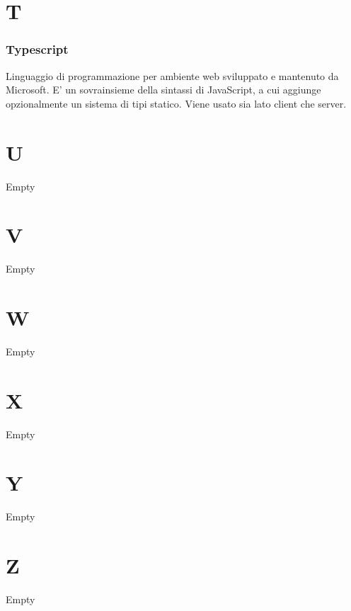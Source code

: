 \section*{T}
\subsubsection*{Typescript}
Linguaggio di programmazione per ambiente web sviluppato e mantenuto da Microsoft. E' un sovrainsieme della sintassi di JavaScript,
a cui aggiunge opzionalmente un sistema di tipi statico. Viene usato sia lato client che server.

\section*{U}
Empty

\section*{V}
Empty

\section*{W}
Empty

\section*{X}
Empty

\section*{Y}
Empty

\section*{Z}
Empty
